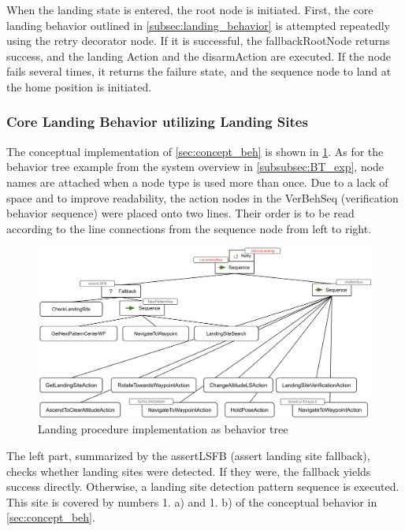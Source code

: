 When the landing state is entered, the root node is initiated. First, the core landing behavior outlined in \cref{subsec:landing_behavior} is attempted repeatedly using the retry decorator node. If it is successful, the fallbackRootNode returns success, and the landing Action and the disarmAction are executed. If the node fails several times, it returns the failure state, and the sequence node to land at the home position is initiated.

\subsubsection{Core Landing Behavior utilizing Landing Sites}

The conceptual implementation of \cref{sec:concept_beh} is shown in \cref{fig:landing_BT}. As for the behavior tree example from the system overview in \cref{subsubsec:BT_exp}, node names are attached when a node type is used more than once. Due to a lack of space and to improve readability, the action nodes in the VerBehSeq (verification behavior sequence) were placed onto two lines. Their order is to be read according to the line connections from the sequence node from left to right.

\clearpage%

\begin{figure}[h]
\centering
\includegraphics[scale=0.18]{images/autonomous_landing/landing_behavior_BT.png}
\caption{Landing procedure implementation as behavior tree}
\label{fig:landing_BT}
\end{figure}

The left part, summarized by the assertLSFB (assert landing site fallback), checks whether landing sites were detected. If they were, the fallback yields success directly. Otherwise, a landing site detection pattern sequence is executed. This site is covered by numbers 1. a) and 1. b) of the conceptual behavior in \cref{sec:concept_beh}.

